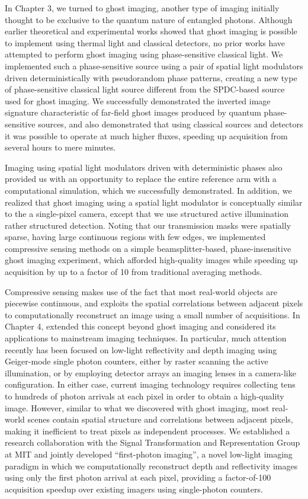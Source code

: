 In Chapter 3, we turned to ghost imaging, another type of imaging initially thought to be exclusive to the quantum nature of entangled photons. Although earlier theoretical and experimental works showed that ghost imaging is possible to implement using thermal light and classical detectors, no prior works have attempted to perform ghost imaging using phase-sensitive classical light. We implemented such a phase-sensitive source using a pair of spatial light modulators driven deterministically with pseudorandom phase patterns, creating a new type of phase-sensitive classical light source different from the SPDC-based source used for ghost imaging. We successfully demonstrated the inverted image signature characteristic of far-field ghost images produced by quantum phase-sensitive sources, and also demonstrated that using classical sources and detectors it was possible to operate at much higher fluxes, speeding up acquisition from several hours to mere minutes.

Imaging using spatial light modulators driven with deterministic phases also provided us with an opportunity to replace the entire reference arm with a computational simulation, which we successfully demonstrated. In addition, we realized that ghost imaging using a spatial light modulator is conceptually similar to the a single-pixel camera, except that we use structured active illumination rather structured detection. Noting that our transmission masks were spatially sparse, having large continuous regions with few edges, we implemented compressive sensing methods on a simple beamsplitter-based, phase-insensitive ghost imaging experiment, which afforded high-quality images while speeding up acquisition by up to a factor of 10 from traditional averaging methods.

Compressive sensing makes use of the fact that most real-world objects are piecewise continuous, and exploits the spatial correlations between adjacent pixels to computationally reconstruct an image using a small number of acquisitions. In Chapter 4, extended this concept beyond ghost imaging and considered its applications to mainstream imaging techniques. In particular, much attention recently has been focused on low-light reflectivity and depth imaging using Geiger-mode single photon counters, either by raster scanning the active illumination, or by employing detector arrays an imaging lenses in a camera-like configuration. In either case, current imaging technology requires collecting tens to hundreds of photon arrivals at each pixel in order to obtain a high-quality image. However, similar to what we discovered with ghost imaging, most real-world scenes contain spatial structure and correlations between adjacent pixels, making it inefficient to treat pixels as independent processes. We established a research collaboration with the Signal Transformation and Representation Group at MIT and jointly developed ``first-photon imaging'', a novel low-light imaging paradigm in which we computationally reconstruct depth and reflectivity images using only the first photon arrival at each pixel, providing a factor-of-100 acquisition speedup over existing imagers using single-photon counters.

